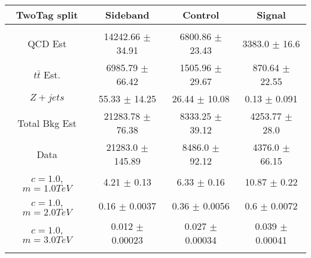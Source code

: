 \begin{footnotesize} 
\begin{tabular}{c|c|c|c} 
TwoTag split & Sideband & Control & Signal \\ 
\hline\hline 
& & & \\ 
QCD Est & 14242.66 $\pm$ 34.91 & 6800.86 $\pm$ 23.43 & 3383.0 $\pm$ 16.6\\ 
$t\bar{t}$ Est.  & 6985.79 $\pm$ 66.42 & 1505.96 $\pm$ 29.67 & 870.64 $\pm$ 22.55\\ 
$Z+jets$ & 55.33 $\pm$ 14.25 & 26.44 $\pm$ 10.08 & 0.13 $\pm$ 0.091\\ 
Total Bkg Est & 21283.78 $\pm$ 76.38 & 8333.25 $\pm$ 39.12 & 4253.77 $\pm$ 28.0\\ 
Data & 21283.0 $\pm$ 145.89 & 8486.0 $\pm$ 92.12 & 4376.0 $\pm$ 66.15\\ 
$c=1.0$,$m=1.0TeV$ & 4.21 $\pm$ 0.13 & 6.33 $\pm$ 0.16 & 10.87 $\pm$ 0.22\\ 
$c=1.0$,$m=2.0TeV$ & 0.16 $\pm$ 0.0037 & 0.36 $\pm$ 0.0056 & 0.6 $\pm$ 0.0072\\ 
$c=1.0$,$m=3.0TeV$ & 0.012 $\pm$ 0.00023 & 0.027 $\pm$ 0.00034 & 0.039 $\pm$ 0.00041\\ 
& & & \\ 
\hline\hline 
\end{tabular} 
\end{footnotesize} 
\newline 

